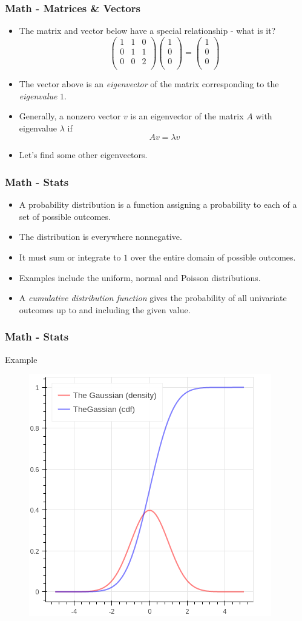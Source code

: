 \documentclass{beamer}
\begin{document}
\frame
{
\frametitle{Math - Matrices \& Vectors}
\begin{itemize}[<+->]
\item The matrix and vector below have a special relationship - what is it? 
\[
\begin{pmatrix}
1 & 1 & 0 \\
0 & 1 & 1 \\
0 & 0 & 2 \\
\end{pmatrix}
\begin{pmatrix}
1\\
0\\
0\\
\end{pmatrix}
=
\begin{pmatrix}
1\\
0\\
0\\
\end{pmatrix}
\]
\item The vector above is an \emph{eigenvector} of the matrix corresponding to the \emph{eigenvalue} $1$.
\item Generally, a nonzero vector $v$ is an eigenvector of the matrix $A$ with eigenvalue $\lambda$ if
\[ Av = \lambda v\] 
\item Let's find some other eigenvectors.
\end{itemize}
}

\frame
{
\frametitle{Math - Stats}
\begin{itemize}[<+->]
\item A probability distribution is a function assigning a probability to each of a set of possible outcomes.
\item The distribution is everywhere nonnegative.
\item It must sum or integrate to $1$ over the entire domain of possible outcomes.
\item Examples include the uniform, normal and Poisson distributions.
\item A \emph{cumulative distribution function} gives the probability of all univariate outcomes up to and including the given value.
\end{itemize}
}

\frame
{
\frametitle{Math - Stats}
Example \\
\begin{figure}
  \includegraphics[width=.4\textwidth]{gaussian_cdf.png}
\end{figure}
}
\end{document}
